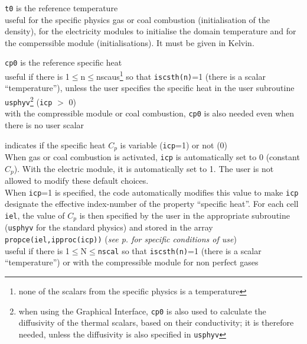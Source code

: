 {{\tt t0} is the reference temperature \\
useful for the specific physics gas or coal combustion (initialisation
of the density), for the electricity modules to initialise the domain
temperature and for the comperssible module (initialisations). It must be given
in Kelvin.}

{{\tt cp0} is the reference specific heat\\
useful if there is 1$\leqslant$n$\leqslant$nscaus\footnote{none of the scalars
from the specific physics is a temperature} so that {\tt iscsth(n)}=1
(there is a scalar ``temperature''), unless the user specifies the
specific heat in the user subroutine \texttt{usphyv}\footnote{when using the
Graphical Interface, {\tt cp0} is also used to calculate the diffusivity of the
thermal scalars, based on their conductivity; it is therefore needed, unless the
diffusivity is also specified in \texttt{usphyv}} ({\tt icp} $>$ 0)\\
with the compressible module or coal combustion, {\tt cp0} is also needed even when
there is no user scalar}

{indicates if the specific heat $C_p$ is variable
({\tt icp}=1) or not (0)\\
When gas or coal combustion is activated, {\tt icp} is automatically set to 0
(constant $C_p$). With the electric module, it is automatically set to 1.
The user is not allowed to modify these default choices.\\
When {\tt icp}=1 is specified, the code automatically modifies this value to
make {\tt icp} designate the effective index-number of the property
``specific heat''. For each cell {\tt iel}, the value of
$C_p$ is then specified by the user in the appropriate subroutine
(\texttt{usphyv} for the standard physics) and stored in the array\\
{\tt propce(iel,ipproc(icp))}
({\em see p.\pageref{prg_propvar} for specific conditions of use})\\
useful if there is 1$\leqslant$N$\leqslant${\tt nscal} so that {\tt iscsth(n)}=1
(there is a scalar ``temperature'') or with the compressible module for non
perfect gases}


